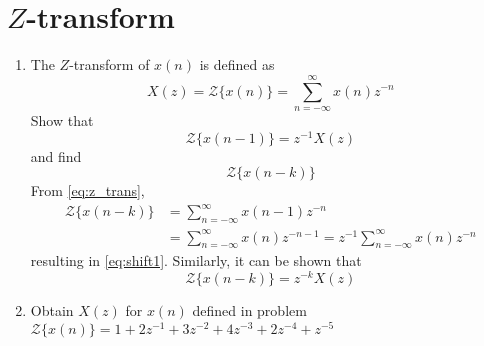\documentclass[journal,12pt,twocolumn]{IEEEtran}
\renewcommand\thesection{\arabic{section}}
\begin{document}
\section{$Z$-transform}
\begin{enumerate}[label=\thesection.\arabic*]
\item The $Z$-transform of $x(n)$ is defined as
%
\begin{equation}
\label{eq:z_trans}
X(z)={\mathcal {Z}}\{x(n)\}=\sum _{n=-\infty }^{\infty }x(n)z^{-n}
\end{equation}
%
Show that
\begin{equation}
\label{eq:shift1}
{\mathcal {Z}}\{x(n-1)\} = z^{-1}X(z)
\end{equation}
and find
\begin{equation}
	{\mathcal {Z}}\{x(n-k)\} 
\end{equation}
\solution From \eqref{eq:z_trans},
\begin{align}
{\mathcal {Z}}\{x(n-k)\} &=\sum _{n=-\infty }^{\infty }x(n-1)z^{-n}
\\
&=\sum _{n=-\infty }^{\infty }x(n)z^{-n-1} = z^{-1}\sum _{n=-\infty }^{\infty }x(n)z^{-n}
\end{align}
resulting in \eqref{eq:shift1}. Similarly, it can be shown that
%
\begin{equation}
\label{eq:z_trans_shift}
	{\mathcal {Z}}\{x(n-k)\} = z^{-k}X(z)
\end{equation}
\item Obtain $X(z)$ for $x(n)$ defined in problem 
${\mathcal {Z}}\{x(n)\}=1+2z^{-1}+3z^{-2}+4z^{-3}+2z^{-4}+z^{-5}$


\end{enumerate}
\end{document}
